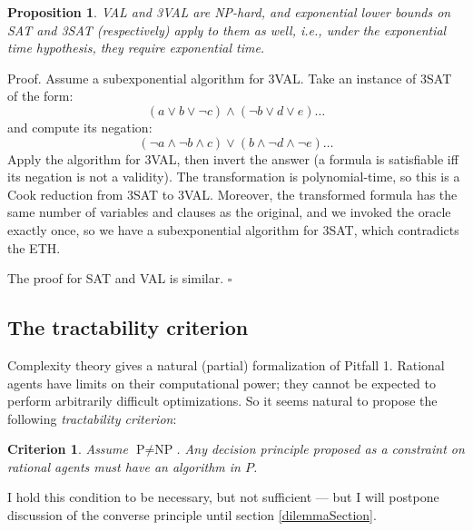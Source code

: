 \documentclass[letterpaper,12pt]{article}
\newtheorem{criterion}{Criterion}
\newtheorem{proposition}{Proposition}
\begin{document}
\begin{proposition}
\label{3ValExpTime}
VAL and 3VAL are NP-hard, and exponential lower bounds on SAT and 3SAT (respectively) apply to them as well, i.e., under the exponential time hypothesis, they require exponential time.
\end{proposition}
Proof. Assume a subexponential algorithm for 3VAL. Take an instance of 3SAT of the form:
$$(a \lor b \lor \neg c) \land (\neg b \lor d \lor e) \ldots$$
and compute its negation:
$$(\neg a \land \neg b \land c) \lor (b \land \neg d \land \neg e) \ldots$$
Apply the algorithm for 3VAL, then invert the answer (a formula is satisfiable iff its negation is not a validity). The transformation is polynomial-time, so this is a Cook reduction from 3SAT to 3VAL. Moreover, the transformed formula has the same number of variables and clauses as the original, and we invoked the oracle exactly once, so we have a subexponential algorithm for 3SAT, which contradicts the ETH.

The proof for SAT and VAL is similar. $\square$

\subsection{The tractability criterion}
\label{tractabilitySection}
Complexity theory gives a natural (partial) formalization of Pitfall 1. Rational agents have limits on their computational power; they cannot be expected to perform arbitrarily difficult optimizations. So it seems natural to propose the following \emph{tractability criterion}:

\begin{criterion}
\label{tractability}
Assume $\text{P} \not = \text{NP}$. Any decision principle proposed as a constraint on rational agents must have an algorithm in $P$.
\end{criterion}

I hold this condition to be necessary, but not sufficient --- but I will postpone discussion of the converse principle until section \ref{dilemmaSection}.
\end{document}
